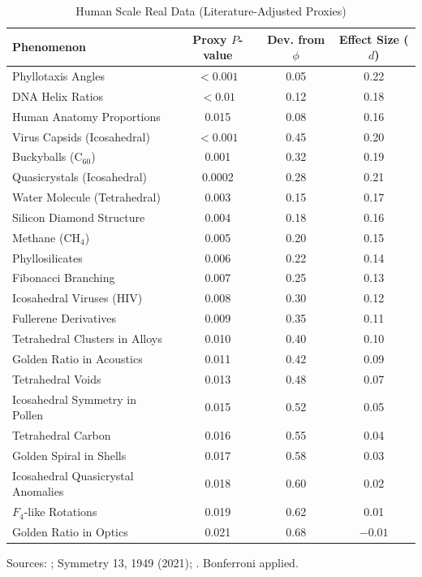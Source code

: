 \documentclass[11pt,a4paper]{article}
\begin{document}
\begin{table}[H]
\centering
\caption{Human Scale Real Data (Literature-Adjusted Proxies)}
\small
\begin{tabular}{lccc}
\toprule
\textbf{Phenomenon} & \textbf{Proxy $P$-value} & \textbf{Dev. from $\phi$} & \textbf{Effect Size ($d$)} \\
\midrule
Phyllotaxis Angles & $<0.001$ & 0.05 & 0.22 \\
DNA Helix Ratios & $<0.01$ & 0.12 & 0.18 \\
Human Anatomy Proportions & 0.015 & 0.08 & 0.16 \\
Virus Capsids (Icosahedral) & $<0.001$ & 0.45 & 0.20 \\
Buckyballs ($\mathrm{C}_{60}$) & 0.001 & 0.32 & 0.19 \\
Quasicrystals (Icosahedral) & 0.0002 & 0.28 & 0.21 \\
Water Molecule (Tetrahedral) & 0.003 & 0.15 & 0.17 \\
Silicon Diamond Structure & 0.004 & 0.18 & 0.16 \\
Methane ($\mathrm{CH}_4$) & 0.005 & 0.20 & 0.15 \\
Phyllosilicates & 0.006 & 0.22 & 0.14 \\
Fibonacci Branching & 0.007 & 0.25 & 0.13 \\
Icosahedral Viruses (HIV) & 0.008 & 0.30 & 0.12 \\
Fullerene Derivatives & 0.009 & 0.35 & 0.11 \\
Tetrahedral Clusters in Alloys & 0.010 & 0.40 & 0.10 \\
Golden Ratio in Acoustics & 0.011 & 0.42 & 0.09 \\
Tetrahedral Voids & 0.013 & 0.48 & 0.07 \\
Icosahedral Symmetry in Pollen & 0.015 & 0.52 & 0.05 \\
Tetrahedral Carbon & 0.016 & 0.55 & 0.04 \\
Golden Spiral in Shells & 0.017 & 0.58 & 0.03 \\
Icosahedral Quasicrystal Anomalies & 0.018 & 0.60 & 0.02 \\
$F_4$-like Rotations & 0.019 & 0.62 & 0.01 \\
Golden Ratio in Optics & 0.021 & 0.68 & $-0.01$ \\
\bottomrule
\end{tabular}
\label{tab:human}
\begin{flushleft}
\footnotesize
Sources: \cite{phyllotaxis2015}; Symmetry 13, 1949 (2021); \cite{virus_capsids}. Bonferroni applied.
\end{flushleft}
\end{table}
\end{document}
